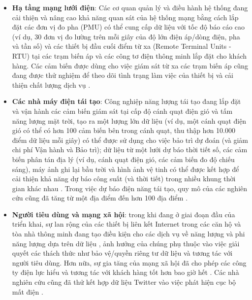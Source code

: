 \documentclass[utf8]{frontiersSCNS} %
\begin{document}
\begin{itemize}
	\item \textbf{Hạ tầng mạng lưới điện}: Các cơ quan quản lý và điều hành hệ thống đang cải thiện và nâng cao khả năng quan sát của hệ thống mạng bằng cách lắp đặt các đơn vị đo pha (PMU) có thể cung cấp dữ liệu với tốc độ báo cáo cao (ví dụ, 30 đơn vị đo lường trên mỗi giây của độ lớn điện áp/dòng điện, pha và tần số) và các thiết bị đầu cuối điểm từ xa (Remote Terminal Units - RTU) tại các trạm biến áp và các công tơ điện thông minh lắp đặt cho khách hàng. Các cảm biến được dùng cho việc giám sát từ xa các trạm biến áp cũng đang được thử nghiệm để theo dõi tình trạng làm việc của thiết bị và cải thiện chất lượng dịch vụ \citep{Leitao2015}.
	
	\item \textbf{Các nhà máy điện tái tạo}: Công nghiệp năng lượng tái tạo đang lắp đặt và vận hành các cảm biến giám sát tại cấp độ cánh quạt điện gió và tấm năng lượng mặt trời, tạo ra một lượng lớn dữ liệu (ví dụ, một cánh quạt điện gió có thể có hơn 100 cảm biến bên trong cánh quạt, thu thập hơn 10.000 điểm dữ liệu mỗi giây) có thể được sử dụng cho việc bảo trì dự đoán (và giảm chi phí Vận hành và Bảo trì); dữ liệu từ một lưới dự báo thời tiết số, các cảm biến phân tán địa lý (ví dụ, cánh quạt điện gió, các cảm biến đo độ chiếu sáng), máy ảnh ghi lại bầu trời và hình ảnh vệ tinh có thể được kết hợp để cải thiện khả năng dự báo công suất (và thời tiết) trong nhiều khung thời gian khác nhau \citep{Sweeney2020}. Trong việc dự báo điện năng tái tạo, quy mô của các nghiên cứu cũng đã tăng từ một địa điểm đến hơn 100 địa điểm \citep{Messner2019}.
	
	\item \textbf{Người tiêu dùng và mạng xã hội}: trong khi đang ở giai đoạn đầu của triển khai, sự lan rộng của các thiết bị liên kết Internet trong các căn hộ và tòa nhà thông minh đang tạo điều kiện cho các dịch vụ về năng lượng và phi năng lượng dựa trên dữ liệu \citep{Ahmed2016}, ảnh hưởng của chúng phụ thuộc vào việc giải quyết các thách thức như bảo vệ/quyền riêng tư dữ liệu và tương tác với người tiêu dùng. Hơn nữa, sự gia tăng của mạng xã hội đã cho phép các công ty điện lực hiểu và tương tác với khách hàng tốt hơn bao giờ hết \citep{MorenoMunoz2016}. Các nhà nghiên cứu cũng đã thử kết hợp dữ liệu Twitter vào việc phát hiện cục bộ mất điện \citep{Sun2016}.
	

\end{itemize}
\end{document}
